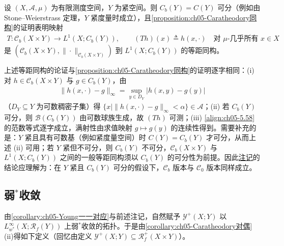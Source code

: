 \documentclass[../../main.tex]{subfiles}%
\begin{document}
\begin{remark}\label{remark:ch05-紧空间同构}
设 $(X,\mathcal{A},\mu)$ 为有限测度空间，$Y$ 为紧空间。则 $C_b(Y)=C(Y)$ 可分（例如由 Stone--Weierstrass 定理，$Y$ 紧度量时成立），且\cref{proposition:ch05-Caratheodory同构}的证明表明映射
\begin{align}
T:\mathcal{C}_b(X\times Y)\to L^1(X;C_b(Y)),\qquad
(Th)(x)\triangleq h(x,\cdot)
\quad\text{对 }\mu\text{-几乎所有 }x\in X\label{align:ch05-5.59}
\end{align}
是 $(\mathcal{C}_b(X\times Y),\|\cdot\|_{\mathcal{C}_b(X\times Y)})$ 到 $L^1(X;C_b(Y))$ 的等距同构。
\end{remark}

\begin{remark}\label{remark:ch05-紧空间同构修正}
上述等距同构的论证与\cref{proposition:ch05-Caratheodory同构}的证明逐字相同：(i) 对 $h\in\mathcal{C}_b(X\times Y)$ 与 $g\in C_b(Y)$，由
\begin{align*}
\|h(x,\cdot)-g\|_\infty=\sup_{y\in D_Y}|h(x,y)-g(y)|
\end{align*}
（$D_Y\subseteq Y$ 为可数稠密子集）得 $\{x\mid\|h(x,\cdot)-g\|_\infty<\alpha\}\in\mathcal{A}$；(ii) 若 $C_b(Y)$ 可分，则 $\mathscr{B}(C_b(Y))$ 由可数球族生成，故 $(Th)$ 可测；(iii) \eqref{align:ch05-5.58}的范数等式逐字成立，满射性由求值映射 $g\mapsto g(y)$ 的连续性得到。需要补充的是：$Y$ 紧且具有可数基（例如紧度量空间）时 $C(Y)=C_b(Y)$ 才可分，从而上述 (ii) 可用；若 $Y$ 紧但不可分，则 $C_b(Y)$ 不可分，$\mathcal{C}_b(X\times Y)$ 与 $L^1(X;C_b(Y))$ 之间的一般等距同构须以 $C_b(Y)$ 的可分性为前提。因此\hyperref[remark:ch05-紧空间同构]{注记}的结论应理解为：在 $Y$ 紧且 $C_b(Y)$ 可分的假设下，$\mathcal{C}_b$ 版本与 $\mathcal{C}_0$ 版本同样成立。
\end{remark}

\subsection{弱$^*$收敛}\label{subsection:ch05-Young弱星}

由\cref{corollary:ch05-Young一一对应}与前述注记，自然赋予 $\mathcal{Y}^+(X;Y)$ 以 $L^\infty_{w^*}(X;\mathscr{R}_f(Y))$ 上弱$^*$收敛的拓扑。于是由\cref{corollary:ch05-Caratheodory对偶}(ii)得如下定义（回忆由定义 $\mathcal{Y}^+(X;Y)\subseteq\mathscr{R}^+_f(X\times Y)$）。
\end{document}
